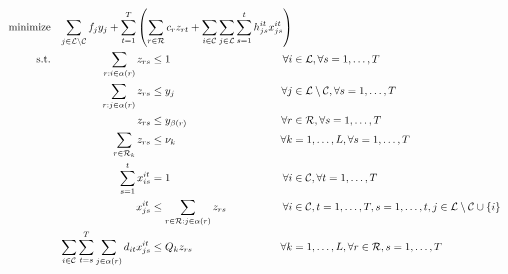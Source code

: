                 \begin{alignat}{3}
                    \text{minimize} &&\sum_{j\in \loc \setminus \cu} f_{j} y_{j} +\sum_{t=1}^{T} \left( \sum_{r\in \ro} c_r z_{rt} + \sum_{i\in \cu} \sum_{j\in\loc}\sum_{s=1}^t h^{it}_{js}x^{it}_{js}\right)\span\span\label{objfunct2}\\ 
    \text{s.t.}  %
    &&\sum_{r : i\in\alpha(r)} z_{rs} &\leq 1 															&\forall i&\in \loc, \forall s=1,\ldots,T  \label{const:singleroutecustomers2}\\
    &&\sum_{r : j\in\alpha(r)} z_{rs} &\leq y_j 															&\forall j&\in \loc\setminus \cu, \forall s=1,\ldots,T  \label{const:singleroutedc2}\\
    &&z_{rs} 					&\leq y_{\beta(r)} 													&\forall r&\in \ro, \forall s=1,\ldots,T\label{const:startfromopendepots2}\\
    &&\sum_{r\in \ro_k} z_{rs} &\leq 	\nu_k													&\forall k&=1,\ldots,L, \forall s=1,\ldots,T  \label{const:fleetcapa2}\\
    &&\sum_{s=1}^t x^{it}_{is}   		& = 1 														&\forall i&\in \cu, \forall t=1,\ldots, T\label{const:satdemands}\\
    &&x^{it}_{js}   		&\leq \sum_{r\in\ro : j\in\alpha(r)} z_{rs}													&\forall i&\in \cu, t=1,\ldots,T, s=1,\ldots,t,j\in\loc\setminus\cu\cup\{i\}\label{const:deliveryConstLoc2}\\
    &&\sum_{i\in\cu}\sum_{t=s}^T\sum_{j\in\alpha(r)} d_{it} x^{it}_{js}   		&\leq Q_k z_{rs} 														&\forall k&=1,\ldots,L, \forall r\in \ro, s=1,\ldots,T\label{const:deliveryUB2}\\

\end{alignat}
